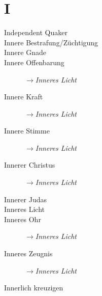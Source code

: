 \section*{I}

\articlesize

\begin{description}

\item[Independent Quaker]

 \item[Innere Bestrafung/Züchtigung]
 \item[Innere Gnade]
 \item[Innere Offenbarung] $\to$\textit{Inneres Licht}
 \item[Innere Kraft] $\to$\textit{Inneres Licht}
 \item[Innere Stimme] $\to$\textit{Inneres Licht}
 \item[Innerer Christus] $\to$\textit{Inneres Licht}
 \item[Innerer Judas]
 \item[Inneres Licht]
 \item[Inneres Ohr] $\to$\textit{Inneres Licht}
 \item[Inneres Zeugnis] $\to$\textit{Inneres Licht}
 \item[Innerlich kreuzigen]
 \end{description}

\normalsize